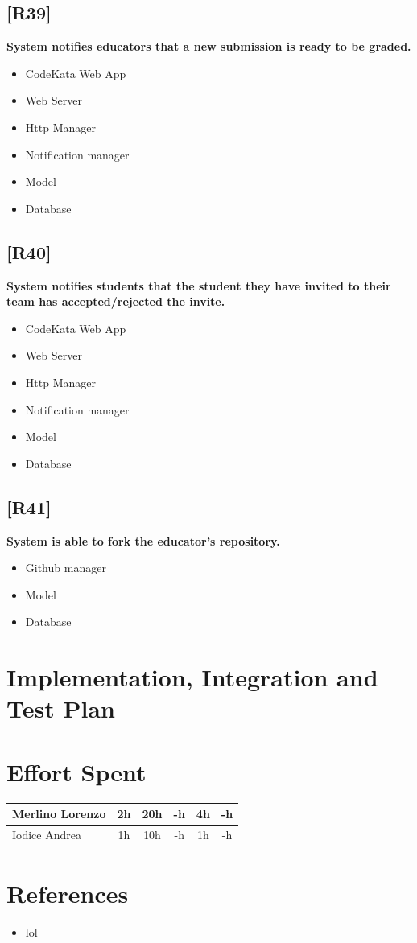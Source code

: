 \documentclass{article}
\begin{document}
\subsection{[R39]}
\textbf{ System notifies educators that a new submission is ready to be graded.}
\begin{itemize}
\item CodeKata Web App
\item Web Server
\item Http Manager
\item Notification manager
\item Model
\item Database
\end{itemize}
\subsection{[R40]}
\textbf{ System notifies students that the student they have invited to their team has accepted/rejected the invite.}
\begin{itemize}
\item CodeKata Web App
\item Web Server
\item Http Manager
\item Notification manager
\item Model
\item Database
\end{itemize}
\subsection{[R41]}
\textbf{ System is able to fork the educator’s repository.}
\begin{itemize}
\item Github manager
\item Model
\item Database
\end{itemize}

\newpage
\section{Implementation, Integration and Test Plan}

\newpage
\section{Effort Spent}
\begin{center}
\begin{tabular}{||l|c|c|c|c|c||}
\hline
Merlino Lorenzo & 2h & 20h & -h & 4h & -h
\\
\hline
Iodice Andrea & 1h & 10h & -h & 1h & -h
\\
\hline
\end{tabular}
\end{center}

\newpage
\section{References}
\begin{itemize}
\item lol
\end{itemize}
\end{document}
